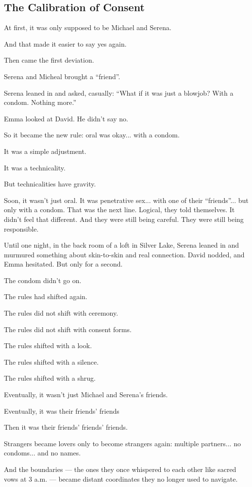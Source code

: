 
\subsection{The Calibration of Consent}

At first, it was only supposed to be Michael and Serena.

And that made it easier to say yes again.

Then came the first deviation.

Serena and Micheal brought a ``friend''.

Serena leaned in and asked, casually: 
``What if it was just a blowjob? With a condom. Nothing more.''

Emma looked at David. He didn’t say no.

So it became the new rule: oral was okay... with a condom.

It was a simple adjustment. 

It was a technicality.

But technicalities have gravity.

Soon, it wasn’t just oral.
It was penetrative sex... with one of their ``friends''... but only with a condom.
That was the next line. Logical, they told themselves. It didn’t feel that different. And they were 
still being careful. They were still being responsible.

Until one night, in the back room of a loft in Silver Lake, Serena leaned in and murmured something 
about skin-to-skin and real connection. David nodded, and Emma hesitated. But only for a second.

The condom didn’t go on.

The rules had shifted again.

The rules did not shift with ceremony. 

The rules did not shift with consent forms.

The rules shifted with a look. 

The rules shifted with a silence. 

The rules shifted with a shrug.

Eventually, it wasn’t just Michael and Serena's friends.

Eventually, it was their friends' friends

Then it was their friends’ friends' friends.

Strangers became lovers only to become strangers again:
multiple partners...
no condoms...
and no names.

And the boundaries --- the ones they once whispered to each other like sacred vows at 
3 a.m. --- became distant coordinates they no longer used to navigate.

